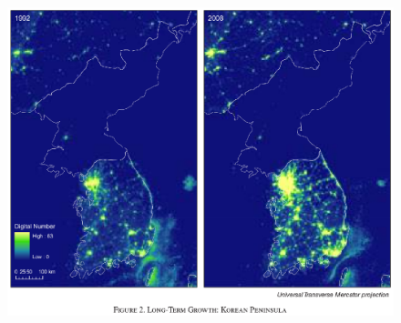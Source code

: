 \documentclass{beamer}
\begin{document}
\begin{frame}
  \begin{figure}
    \includegraphics[scale=.7]{henderson_et_al.eps}
  \end{figure}
\end{frame}
\end{document}
